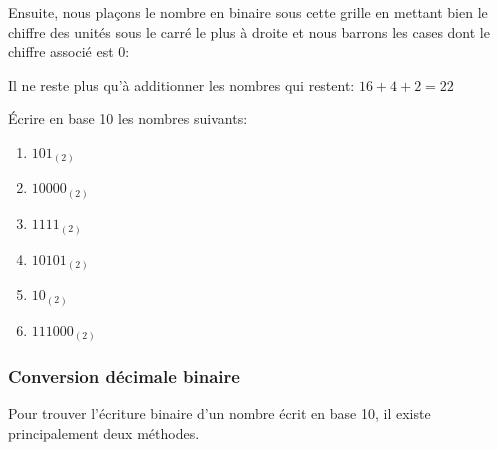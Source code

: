 \documentclass[11pt, a4paper]{book}
\begin{document}
Ensuite, nous plaçons le nombre en binaire sous cette grille en mettant bien le chiffre des unités sous le carré le plus à droite et nous barrons les cases dont le chiffre associé est 0:

\begin{center}
\end{center}

Il ne reste plus qu'à additionner les nombres qui restent: $16 + 4 + 2=22$

\begin{exercice}
\'Ecrire en base 10 les nombres suivants:
\begin{multicols}{2}
\begin{enumerate}
\item $101_{(2)}$
\item $10 000_{(2)}$
\item $1111_{(2)}$
\item $10101_{(2)}$
\item $10_{(2)}$
\item $111 000_{(2)}$

\end{enumerate}
\end{multicols}
\end{exercice}

\subsubsection{Conversion décimale binaire}

Pour trouver l'écriture binaire d'un nombre écrit en base 10, il existe principalement deux méthodes. 


\; 
\end{document}
